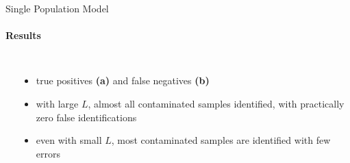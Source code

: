 \documentclass[letter,graphicx]{beamer}
\begin{document}
\begin{frame}{Single Population Model}
\framesubtitle{Results}
\begin{columns}[c]
\column{2.25in}
\begin{table}
\begin{scriptsize}
\hrule\hrule
\mbox{}\\

\hrule
\end{scriptsize}
\end{table}

\column{2.25in}
\begin{itemize}
\item true positives \textbf{(a)} and false negatives \textbf{(b)}
\vspace{3mm}
\item with large $L$, almost all contaminated samples identified, with practically zero false identifications
\vspace{3mm}
\item even with small $L$, most contaminated samples are identified with few errors
\end{itemize}
\end{columns}
\end{frame}
\end{document}
